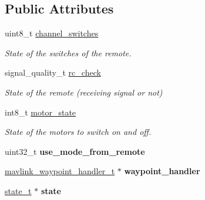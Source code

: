 \subsection*{Public Attributes}
\begin{DoxyCompactItemize}
\item 
\hypertarget{structstate__machine__t_aeab134748574d10d2f836137792824d4}{uint8\+\_\+t \hyperlink{structstate__machine__t_aeab134748574d10d2f836137792824d4}{channel\+\_\+switches}}\label{structstate__machine__t_aeab134748574d10d2f836137792824d4}

\begin{DoxyCompactList}\small\item\em State of the switches of the remote. \end{DoxyCompactList}\item 
\hypertarget{structstate__machine__t_a919f491163e8aaeaa53ecad37554f454}{signal\+\_\+quality\+\_\+t \hyperlink{structstate__machine__t_a919f491163e8aaeaa53ecad37554f454}{rc\+\_\+check}}\label{structstate__machine__t_a919f491163e8aaeaa53ecad37554f454}

\begin{DoxyCompactList}\small\item\em State of the remote (receiving signal or not) \end{DoxyCompactList}\item 
\hypertarget{structstate__machine__t_a22ad81cfed4bbe495037e06d769b4039}{int8\+\_\+t \hyperlink{structstate__machine__t_a22ad81cfed4bbe495037e06d769b4039}{motor\+\_\+state}}\label{structstate__machine__t_a22ad81cfed4bbe495037e06d769b4039}

\begin{DoxyCompactList}\small\item\em State of the motors to switch on and off. \end{DoxyCompactList}\item 
\hypertarget{structstate__machine__t_a27a18bb409843026f00c4059b06b1546}{uint32\+\_\+t {\bfseries use\+\_\+mode\+\_\+from\+\_\+remote}}\label{structstate__machine__t_a27a18bb409843026f00c4059b06b1546}

\item 
\hypertarget{structstate__machine__t_a4f3f2ab3f26f770ce44ba747da275900}{\hyperlink{structmavlink__waypoint__handler__t}{mavlink\+\_\+waypoint\+\_\+handler\+\_\+t} $\ast$ {\bfseries waypoint\+\_\+handler}}\label{structstate__machine__t_a4f3f2ab3f26f770ce44ba747da275900}

\item 
\hypertarget{structstate__machine__t_ab1353fe2c4007020bb255aeaf4f4be5a}{\hyperlink{structstate__t}{state\+\_\+t} $\ast$ {\bfseries state}}\label{structstate__machine__t_ab1353fe2c4007020bb255aeaf4f4be5a}


\end{DoxyCompactItemize}
